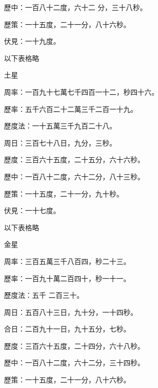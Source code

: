 \begin{pinyinscope}
 歷中：一百八十二度，六十二
 分，三十八秒。



 歷策：一十五度，二十一分，八十六秒。



 伏見：一十九度。



 以下表格略



 土星



 周率：一百九十七萬七千四百一十二，秒四十六。



 歷率：五千六百二十二萬三千二百一十九。



 歷度法：一十五萬三千九百二十八。



 周日：三百七十八日，九分，三秒。



 歷度：三百六十五度，二十五分，六十六秒。



 歷中：一百八十二度，六十二分，八十三秒。



 歷策：一十五度，二十一分，九十秒。



 伏見：一十七度。



 以下表格略



 金星



 周率：三百五萬三千八百四，秒二十三。



 歷率：一百九十萬二百四十，秒一十一。



 歷度法：五千
 二百三十。



 周日：五百八十三日，九十分，一十四秒。



 合日：二百九十一日，九十五分，七秒。



 歷度：三百六十五度，二十四分，六十八秒。



 歷中：一百八十二度，六十二分，三十四秒。



 歷策：一十五度，二十一分，八十六秒。




\end{pinyinscope}
